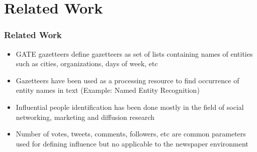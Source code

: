 \documentclass{beamer}
\begin{document}
\section{Related Work}
\begin{frame}
\frametitle{Related Work}
\begin{itemize}
\item
GATE gazetteers define gazetteers as set of lists containing names of entities such as cities, organizations, days of week, etc
\item
Gazetteers have been used as a processing resource to find occurrence of entity names in text (Example: Named Entity Recognition)
\item
Influential people identification has been done mostly in the field of social networking, marketing and diffusion research
\item
 Number of votes, tweets, comments, followers, etc are common parameters used for defining influence but no applicable to the newspaper environment 
\end{itemize} 

\end{frame}

 
\end{document}
